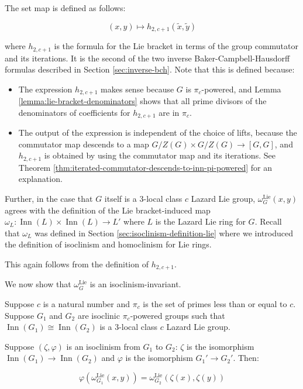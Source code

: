 \documentclass{ucetd}
\begin{document}
The set map is defined as follows:

$$(x,y) \mapsto h_{2,c+1}(\tilde{x},\tilde{y})$$

where $h_{2,c+1}$ is the formula for the Lie bracket in terms of the
group commutator and its iterations. It is the second of the two
inverse Baker-Campbell-Hausdorff formulas described in Section
\ref{sec:inverse-bch}. Note that this is defined because:

\begin{itemize}
\item The expression $h_{2,c+1}$ makes sense because $G$ is $\pi_c$-powered,
  and Lemma \ref{lemma:lie-bracket-denominators} shows that all prime
  divisors of the denominators of coefficients for $h_{2,c+1}$ are in $\pi_c$.
\item The output of the expression is independent of the choice of
  lifts, because the commutator map descends to a map $G/Z(G) \times
  G/Z(G) \to [G,G]$, and $h_{2,c+1}$ is obtained by using the
  commutator map and its iterations. See Theorem
  \ref{thm:iterated-commutator-descends-to-inn-pi-powered} for an
  explanation.
\end{itemize}

Further, in the case that $G$ itself is a $3$-local class $c$ Lazard
Lie group, $\omega_G^{\text{Lie}}(x,y)$ agrees with the definition of
the Lie bracket-induced map $\omega_L: \operatorname{Inn}(L) \times
\operatorname{Inn}(L) \to L'$ where $L$ is the Lazard Lie ring for
$G$. Recall that $\omega_L$ was defined in Section
\ref{sec:isoclinism-definition-lie} where we introduced the definition
of isoclinism and homoclinism for Lie rings. 

This again follows from the definition of $h_{2,c+1}$. 

We now show that $\omega_G^{\text{Lie}}$ is an isoclinism-invariant.

\begin{lemma}\label{lemma:omega-lie-isoclinism-invariant}
  Suppose $c$ is a natural number and $\pi_c$ is the set of primes less
  than or equal to $c$. Suppose $G_1$ and $G_2$ are isoclinic
  $\pi_c$-powered groups such that $\operatorname{Inn}(G_1) \cong
  \operatorname{Inn}(G_2)$ is a $3$-local class $c$ Lazard Lie group.

  Suppose $(\zeta,\varphi)$ is an isoclinism from $G_1$ to $G_2$:
  $\zeta$ is the isomorphism $\operatorname{Inn}(G_1) \to
  \operatorname{Inn}(G_2)$ and $\varphi$ is the isomorphism $G_1' \to
  G_2'$. Then:

  $$\varphi(\omega^{\text{Lie}}_{G_1}(x,y)) = \omega^{\text{Lie}}_{G_2}(\zeta(x),\zeta(y))$$
\end{lemma}
\end{document}
